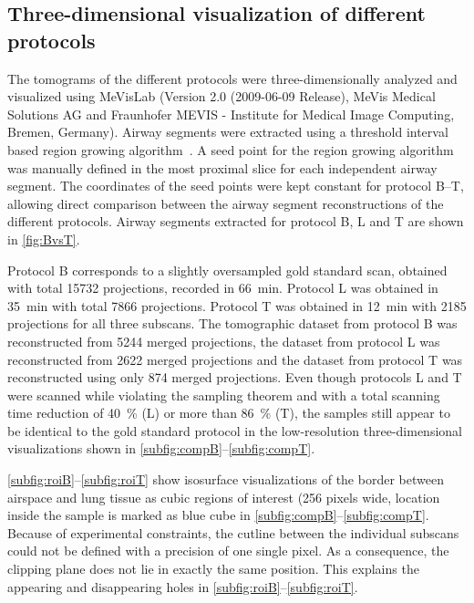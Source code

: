 \subsection{Three-dimensional visualization of different protocols}
\label{subsec:comparison}
The tomograms of the different protocols were three-dimensionally analyzed and visualized using MeVisLab (Version 2.0 (2009-06-09 Release), MeVis Medical Solutions AG and Fraunhofer MEVIS - Institute for Medical Image Computing, Bremen, Germany). Airway segments were extracted using a threshold interval based region growing algorithm~\cite{Zucker1976}. A seed point for the region growing algorithm was manually defined in the most proximal slice for each independent airway segment. The coordinates of the seed points were kept constant for protocol B--T, allowing direct comparison between the airway segment reconstructions of the different protocols. Airway segments extracted for protocol B, L and T are shown in \autoref{fig:BvsT}.

Protocol B corresponds to a slightly oversampled gold standard scan, obtained with total 15732 projections, recorded in \SI{66}{\minute}. Protocol L was obtained in \SI{35}{\minute} with total 7866 projections. Protocol T was obtained in \SI{12}{\minute} with 2185 projections for all three subscans. The tomographic dataset from protocol B was reconstructed from 5244 merged projections, the dataset from protocol L was reconstructed from 2622 merged projections and the dataset from protocol T was reconstructed using only 874 merged projections. Even though protocols L and T were scanned while violating the sampling theorem and with a total scanning time reduction of \SI{40}{\percent} (L) or more than \SI{86}{\percent} (T), the samples still appear to be identical to the gold standard protocol in the low-resolution three-dimensional visualizations shown in \autoref{subfig:compB}--\ref{subfig:compT}.

\autoref{subfig:roiB}--\ref{subfig:roiT} show isosurface visualizations of the border between airspace and lung tissue as cubic regions of interest (256 pixels wide, location inside the sample is marked as blue cube in \autoref{subfig:compB}--\ref{subfig:compT}. Because of experimental constraints, the cutline between the individual subscans could not be defined with a precision of one single pixel. As a consequence, the clipping plane does not lie in exactly the same position. This explains the appearing and disappearing holes in \autoref{subfig:roiB}--\ref{subfig:roiT}.

